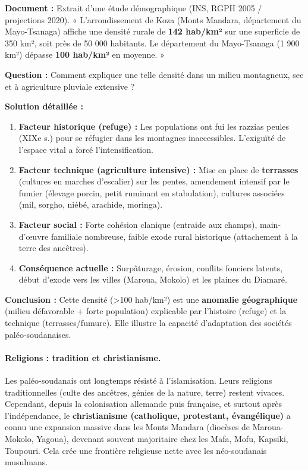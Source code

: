 \documentclass[11pt]{article}
\begin{document}
\begin{exemplebox}
\begin{exoresolu}
\textbf{Document :} Extrait d'une étude démographique (INS, RGPH 2005 / projections 2020). « L'arrondissement de Koza (Monts Mandara, département du Mayo-Tsanaga) affiche une densité rurale de \textbf{142 hab/km²} sur une superficie de 350 km², soit près de 50 000 habitants. Le département du Mayo-Tsanaga (1 900 km²) dépasse \textbf{100 hab/km²} en moyenne. »

\textbf{Question :} Comment expliquer une telle densité dans un milieu montagneux, sec et à agriculture pluviale extensive ?

\tcblower
\textbf{Solution détaillée :}
\begin{enumerate}
    \item \textbf{Facteur historique (refuge) :} Les populations ont fui les razzias peules (XIXe s.) pour se réfugier dans les montagnes inaccessibles. L'exiguïté de l'espace vital a forcé l'intensification.
    \item \textbf{Facteur technique (agriculture intensive) :} Mise en place de \textbf{terrasses} (cultures en marches d'escalier) sur les pentes, amendement intensif par le fumier (élevage porcin, petit ruminant en stabulation), cultures associées (mil, sorgho, niébé, arachide, moringa).
    \item \textbf{Facteur social :} Forte cohésion clanique (entraide aux champs), main-d'œuvre familiale nombreuse, faible exode rural historique (attachement à la terre des ancêtres).
    \item \textbf{Conséquence actuelle :} Surpâturage, érosion, conflits fonciers latents, début d'exode vers les villes (Maroua, Mokolo) et les plaines du Diamaré.
\end{enumerate}
\textbf{Conclusion :} Cette densité (\textgreater 100 hab/km²) est une \textbf{anomalie géographique} (milieu défavorable + forte population) explicable par l'histoire (refuge) et la technique (terrasses/fumure). Elle illustre la capacité d'adaptation des sociétés paléo-soudanaises.
\end{exoresolu}
\end{exemplebox}

\paragraph{Religions : tradition et christianisme.}
Les paléo-soudanais ont longtemps résisté à l'islamisation. Leurs religions traditionnelles (culte des ancêtres, génies de la nature, terre) restent vivaces. Cependant, depuis la colonisation allemande puis française, et surtout après l'indépendance, le \textbf{christianisme (catholique, protestant, évangélique)} a connu une expansion massive dans les Monts Mandara (diocèses de Maroua-Mokolo, Yagoua), devenant souvent majoritaire chez les Mafa, Mofu, Kapsiki, Toupouri. Cela crée une frontière religieuse nette avec les néo-soudanais musulmans.
\end{document}
